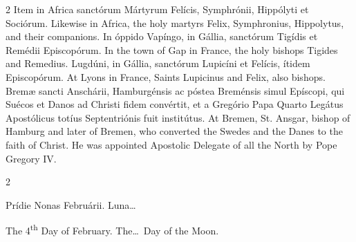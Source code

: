 \begin{paracol}{2}
Item in Africa sanctórum Mártyrum Felícis, Symphrónii, Hippólyti et Sociórum.
\switchcolumn
{}
Likewise in Africa, the holy martyrs Felix, Symphronius, Hippolytus, and 
 their companions.
\switchcolumn*
{}
In óppido Vapíngo, in Gállia, sanctórum Tigídis 
 et Remédii Episcopórum.
\switchcolumn
{}
In the town of Gap in France, the holy bishops Tigides and Remedius.
\switchcolumn*
{}
Lugdúni, in Gállia, sanctórum Lupicíni et Felícis,
 ítidem Episcopórum.
\switchcolumn
{}
At Lyons in France, Saints Lupicinus and Felix, also bishops.
\switchcolumn*
{}
Bremæ sancti Anschárii, Hamburgénsis ac póstea 
 Breménsis simul Epíscopi, qui Suécos et Danos ad Christi fidem convértit, et 
 a Gregório Papa Quarto Legátus Apostólicus totíus Septentriónis fuit 
 institútus.
\switchcolumn
{}
At Bremen, St. Ansgar, bishop of Hamburg and later of Bremen, who converted 
 the Swedes and the Danes to the faith of Christ. He was appointed 
 Apostolic Delegate of all the North by Pope Gregory IV.
\switchcolumn*
{}
\end{paracol}


\begin{paracol}{2}
\begin{center}{\color{gregoriocolor} Prídie Nonas Februárii. 
 Luna\dots\ }\end{center}
\switchcolumn
{}
\begin{center}{\color{gregoriocolor} The 4\textsuperscript{th} Day of 
 February. The\dots\ Day of the Moon.}\end{center}
\end{paracol}

